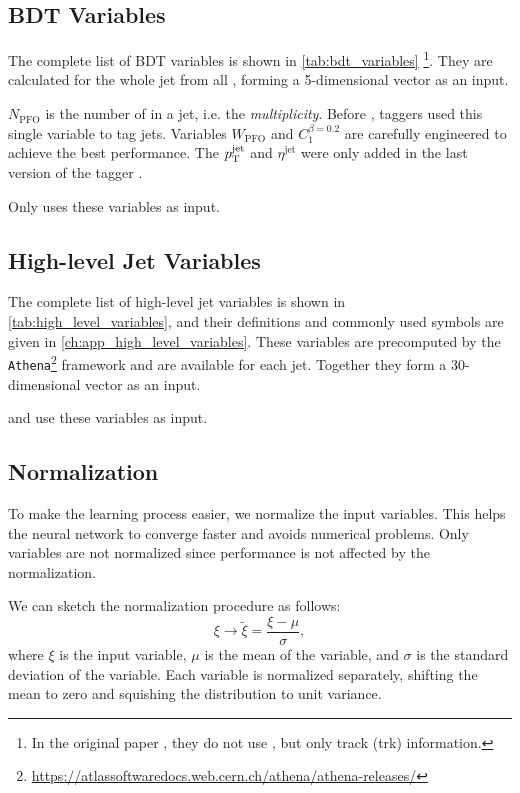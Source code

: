 \subsection{BDT Variables}
\label{sec:bdt_variables}

The complete list of BDT variables is shown in \cref{tab:bdt_variables} \cite{bdt_tag}\footnote{In the original paper \cite{bdt_tag}, they do not use \PFOs, but only track (trk) information.}.
They are calculated for the whole jet from all \PFOs, forming a 5-dimensional vector as an input.

$N_\mathrm{PFO}$ is the number of \PFOs in a jet, i.e. the \emph{multiplicity}.
Before \bdt, taggers used this single variable to tag jets. 
Variables $W_\mathrm{PFO}$ and $C_1^{\beta = 0.2}$ are carefully engineered to achieve the best performance.
The $p_\text{T}^{\text{jet}}$ and $\eta^\mathrm{jet}$ were only added in the last version of the tagger \cite{bdt_tag}.

Only \bdt uses these variables as input.

\subsection{High-level Jet Variables}
\label{sec:high_level_variables}

The complete list of high-level jet variables is shown in \cref{tab:high_level_variables}, and their definitions and commonly used symbols are given in \cref{ch:app_high_level_variables}.
These variables are precomputed by the \texttt{Athena}\footnote{\url{https://atlassoftwaredocs.web.cern.ch/athena/athena-releases/}} framework and are available for each jet.
Together they form a 30-dimensional vector as an input.

\fc and \highway use these variables as input.

\subsection{Normalization}
\label{sec:input_normalization}
To make the learning process easier, we normalize the input variables.
This helps the neural network to converge faster and avoids numerical problems.
Only \bdt variables are not normalized since \bdt performance is not affected by the normalization.

We can sketch the normalization procedure as follows:
\begin{equation}
    \xi \rightarrow \tilde{\xi} = \frac{\xi - \mu}{\sigma},
\end{equation}
where $\xi$ is the input variable, $\mu$ is the mean of the variable, and $\sigma$ is the standard deviation of the variable.
Each variable is normalized separately, shifting the mean to zero and squishing the distribution to unit variance.

